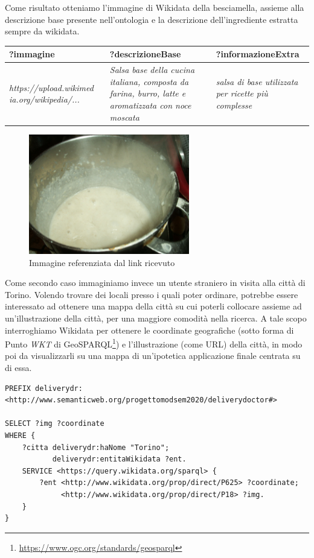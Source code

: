 \documentclass[12pt]{article}
\begin{document}
Come risultato otteniamo l'immagine di Wikidata della besciamella, assieme alla descrizione base presente nell'ontologia e la descrizione dell'ingrediente estratta sempre da wikidata.
\newline
\newline
\begin{tabularx}{\textwidth} { 
  | >{\centering\arraybackslash}X
  | >{\centering\arraybackslash}X
  | >{\centering\arraybackslash}X |}
 \hline
 \textbf{?immagine} & \textbf{?descrizioneBase} & \textbf{?informazioneExtra} \\
 \hline
 \textit{https://upload.wikimed} \textit{ia.org/wikipedia/...} & \textit{Salsa base della cucina italiana, composta da farina, burro, latte e aromatizzata con noce moscata} & \textit{salsa di base utilizzata per ricette più complesse} \\
\hline
\end{tabularx}
\newline
\begin{figure}[H]
    \centering
         \includegraphics[width=7cm]{files/Lasagne_al_forno_salsa_besciamella.jpg}
    \caption{Immagine referenziata dal link ricevuto}
\end{figure}
Come secondo caso immaginiamo invece un utente straniero in visita alla città di Torino.\newline
Volendo trovare dei locali presso i quali poter ordinare, potrebbe essere interessato ad ottenere una mappa della città su cui poterli collocare assieme ad un'illustrazione della città, per una maggiore comodità nella ricerca.\newline
A tale scopo interroghiamo Wikidata per ottenere le coordinate geografiche (sotto forma di Punto \textit{WKT} di GeoSPARQL\footnote{\url{https://www.ogc.org/standards/geosparql}}) e l'illustrazione (come URL) della città, in modo poi da visualizzarli su una mappa di un'ipotetica applicazione finale centrata su di essa.
\newpage
\begin{lstlisting}[language=SPARQL]
PREFIX deliverydr: 
<http://www.semanticweb.org/progettomodsem2020/deliverydoctor#>

SELECT ?img ?coordinate
WHERE {
    ?citta deliverydr:haNome "Torino";
           deliverydr:entitaWikidata ?ent.
    SERVICE <https://query.wikidata.org/sparql> {
        ?ent <http://www.wikidata.org/prop/direct/P625> ?coordinate;
             <http://www.wikidata.org/prop/direct/P18> ?img.
    }
}
\end{lstlisting}
\end{document}
